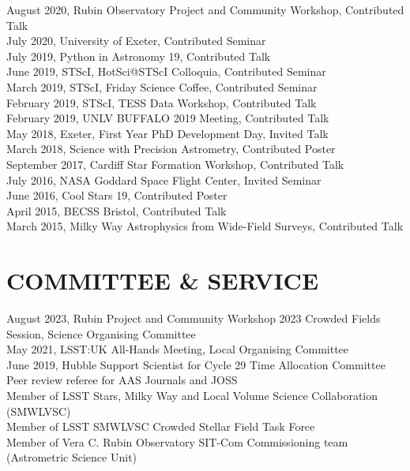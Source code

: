 \documentclass[letter, margin, 10pt]{res} %
\begin{document}
\begin{resume}
August 2020, Rubin Observatory Project and Community Workshop, Contributed Talk\\
July 2020, University of Exeter, Contributed Seminar\\
July 2019, Python in Astronomy 19, Contributed Talk\\
June 2019, STScI, HotSci@STScI Colloquia, Contributed Seminar\\
March 2019, STScI, Friday Science Coffee, Contributed Seminar\\
February 2019, STScI, TESS Data Workshop, Contributed Talk\\
February 2019, UNLV BUFFALO 2019 Meeting, Contributed Talk\\
May 2018, Exeter, First Year PhD Development Day, Invited Talk\\
March 2018, Science with Precision Astrometry, Contributed Poster\\
September 2017, Cardiff Star Formation Workshop, Contributed Talk\\
July 2016, NASA Goddard Space Flight Center, Invited Seminar\\
June 2016, Cool Stars 19, Contributed Poster\\
April 2015, BECSS Bristol, Contributed Talk\\
March 2015, Milky Way Astrophysics from Wide-Field Surveys, Contributed Talk

 \vspace{-6pt}
\section{COMMITTEE \& SERVICE}

August 2023, Rubin Project and Community Workshop 2023 Crowded Fields Session, Science Organising Committee\\
May 2021, LSST:UK All-Hands Meeting, Local Organising Committee\\
June 2019, Hubble Support Scientist for Cycle 29 Time Allocation Committee\\
Peer review referee for AAS Journals and JOSS\\
Member of LSST Stars, Milky Way and Local Volume Science Collaboration (SMWLVSC)\\
Member of LSST SMWLVSC Crowded Stellar Field Task Force\\
Member of Vera C. Rubin Observatory SIT-Com Commissioning team (Astrometric Science Unit)\\


\end{resume}
\end{document}

